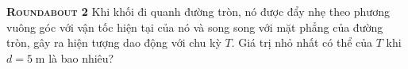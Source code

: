 \begin{problem}
{\textbf{\textsc{Roundabout 2}}} Khi khối đi quanh đường tròn, nó được đẩy nhẹ theo phương vuông góc với vận tốc hiện tại của nó và song song với mặt phẳng của đường tròn, gây ra hiện tượng dao động với chu kỳ $T$. Giá trị nhỏ nhất có thể của $T$ khi $d = 5\;\mathrm{m}$ là bao nhiêu?
\end{problem}